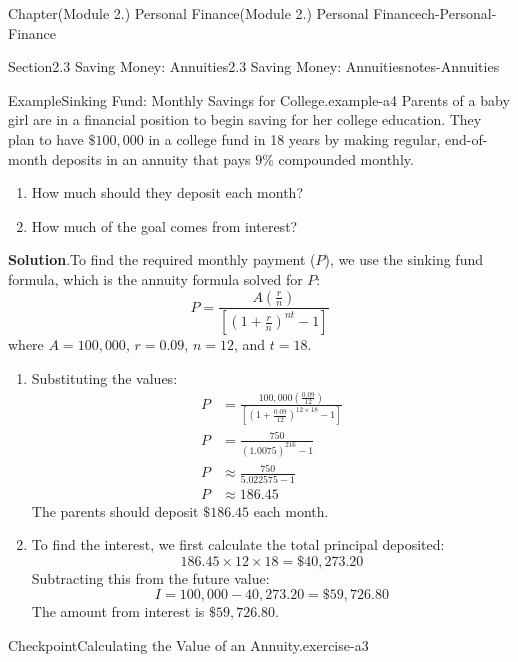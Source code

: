 \documentclass[oneside,10pt,]{book}
\newcommand{\blocktitlefont}{\relax}
\newcommand{\amp}{&}
\begin{document}
\begin{chapterptx}{Chapter}{(Module 2.) Personal Finance}{}{(Module 2.) Personal Finance}{}{}{ch-Personal-Finance}
\begin{sectionptx}{Section}{2.3 Saving Money: Annuities}{}{2.3 Saving Money: Annuities}{}{}{notes-Annuities}
\begin{example}{Example}{Sinking Fund: Monthly Savings for College.}{example-a4}%
Parents of a baby girl are in a financial position to begin saving for her college education. They plan to have \(\$100,000\) in a college fund in 18 years by making regular, end-of-month deposits in an annuity that pays \(9\%\) compounded monthly.%
\begin{enumerate}[label={\arabic*}]
\item{}How much should they deposit each month?%
\item{}How much of the goal comes from interest?%
\end{enumerate}
%
\par\smallskip%
\noindent\textbf{\blocktitlefont Solution}.\hypertarget{example-a4-3}{}\quad{}To find the required monthly payment (\(P\)), we use the sinking fund formula, which is the annuity formula solved for \(P\):%
\begin{equation*}
P = \frac{A \left( \frac{r}{n} \right)}{\left[ \left( 1 + \frac{r}{n} \right)^{nt} - 1 \right]}
\end{equation*}
where \(A = 100,000\), \(r = 0.09\), \(n = 12\), and \(t = 18\).%
\par
%
\begin{enumerate}[label={\arabic*}]
\item{}Substituting the values:%
\begin{align*}
P \amp = \frac{100,000 \left( \frac{0.09}{12} \right)}{\left[ \left( 1 + \frac{0.09}{12} \right)^{12 \times 18} - 1 \right]}\\
P \amp = \frac{750}{(1.0075)^{216} - 1}\\
P \amp \approx \frac{750}{5.022575 - 1}\\
P \amp \approx 186.45
\end{align*}
The parents should deposit \(\$186.45\) each month.%
\item{}To find the interest, we first calculate the total principal deposited:%
\begin{equation*}
186.45 \times 12 \times 18 = \$40,273.20
\end{equation*}
Subtracting this from the future value:%
\begin{equation*}
I = 100,000 - 40,273.20 = \$59,726.80
\end{equation*}
The amount from interest is \(\$59,726.80\).%
\end{enumerate}
%
\end{example}
\begin{inlineexercise}{Checkpoint}{Calculating the Value of an Annuity.}{exercise-a3}%

\end{inlineexercise}
\end{sectionptx}
\end{chapterptx}
\end{document}
